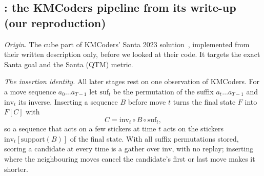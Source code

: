 \subsection{\Msix: the KMCoders pipeline from its write-up (our reproduction)}
\label{sec:m6}

\emph{Origin.} The cube part of KMCoders' Santa 2023 solution~\cite{kmcoders2024santa}, implemented from their written
description only, before we looked at their code. It targets the exact Santa goal and the Santa (QTM) metric.

\emph{The insertion identity.} All later stages rest on one observation of KMCoders. For a move sequence
$a_0\dots a_{T-1}$ let $\mathrm{suf}_t$ be the permutation of the suffix $a_t\dots a_{T-1}$ and $\mathrm{inv}_t$ its
inverse. Inserting a sequence $B$ before move $t$ turns the final state $F$ into $F[C]$ with
\begin{equation}
C=\mathrm{inv}_t\circ B\circ\mathrm{suf}_t ,
\label{eq:insert}
\end{equation}
so a sequence that acts on a few stickers at time $t$ acts on the stickers $\mathrm{inv}_t[\mathrm{support}(B)]$ of the
final state. With all suffix permutations stored, scoring a candidate at every time is a gather over $\mathrm{inv}$, with no
replay; inserting where the neighbouring moves cancel the candidate's first or last move makes it shorter.

